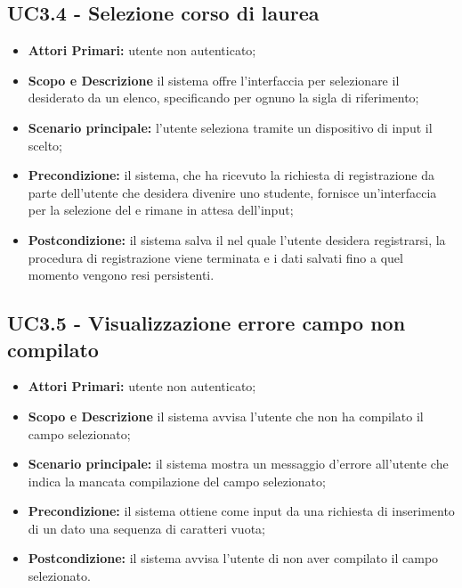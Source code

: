\documentclass[AnalisiDeiRequisiti.tex]{subfiles}
\begin{document}
\subsection{UC3.4 - Selezione corso di laurea}
\begin{itemize}
	\item \textbf{Attori Primari:} utente non autenticato;
	\item \textbf{Scopo e Descrizione} il sistema offre l'interfaccia per selezionare il  desiderato da un elenco, specificando per ognuno la sigla di riferimento;
	\item \textbf{Scenario principale:} l'utente seleziona tramite un dispositivo di input il  scelto;
	\item \textbf{Precondizione:} il sistema, che ha ricevuto la richiesta di registrazione da parte dell'utente che desidera divenire uno studente, fornisce un'interfaccia per la selezione del  e rimane in attesa dell'input;
	\item \textbf{Postcondizione:} il sistema salva il  nel quale l'utente desidera registrarsi, la procedura di registrazione viene terminata e i dati salvati fino a quel momento vengono resi persistenti.
\end{itemize}

\subsection{UC3.5 - Visualizzazione errore campo non compilato}
\begin{itemize}
	\item \textbf{Attori Primari:} utente non autenticato;
	\item \textbf{Scopo e Descrizione} il sistema avvisa l'utente che non ha compilato il campo selezionato;
	\item \textbf{Scenario principale:} il sistema mostra un messaggio d'errore all'utente che indica la mancata compilazione del campo selezionato;
	\item \textbf{Precondizione:} il sistema ottiene come input da una richiesta di inserimento di un dato una sequenza di caratteri vuota;
	\item \textbf{Postcondizione:} il sistema avvisa l'utente di non aver compilato il campo selezionato.
\end{itemize}
\end{document}
